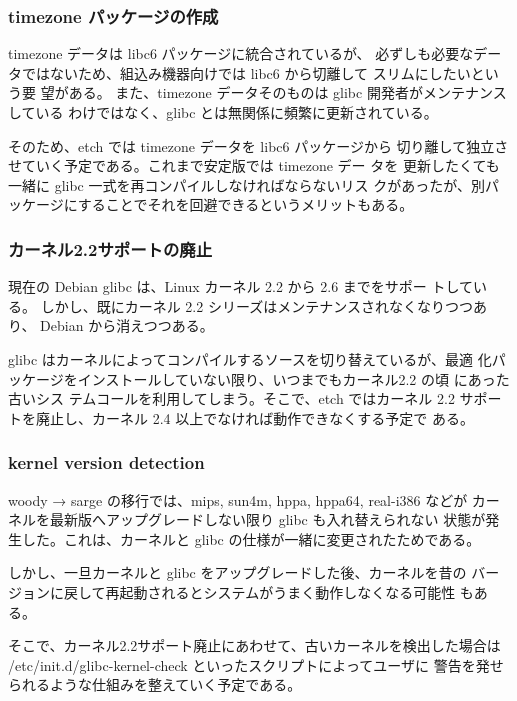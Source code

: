 \documentclass[mingoth,a4paper]{jsarticle}
\begin{document}
  \subsubsection{timezone パッケージの作成}

    timezone データは libc6 パッケージに統合されているが、
    必ずしも必要なデータではないため、組込み機器向けでは libc6 から切離して
    スリムにしたいという要
    望がある。
    また、timezone データそのものは glibc 開発者がメンテナンスしている
    わけではなく、glibc とは無関係に頻繁に更新されている。

    そのため、etch では timezone データを libc6 パッケージから
    切り離して独立させていく予定である。これまで安定版では timezone デー
    タを
    更新したくても一緒に glibc 一式を再コンパイルしなければならないリス
    クがあったが、別パッケージにすることでそれを回避できるというメリットもある。

  \subsubsection{カーネル2.2サポートの廃止}

    現在の Debian glibc は、Linux カーネル 2.2 から 2.6 までをサポー
    トしている。
    しかし、既にカーネル 2.2 シリーズはメンテナンスされなくなりつつあり、
    Debian から消えつつある。

    glibc はカーネルによってコンパイルするソースを切り替えているが、最適
    化パッケージをインストールしていない限り、いつまでもカーネル2.2 の頃
    にあった古いシス
    テムコールを利用してしまう。そこで、etch ではカーネル 2.2 
    サポートを廃止し、カーネル 2.4 以上でなければ動作できなくする予定で
    ある。

  \subsubsection{kernel version detection}

    woody → sarge の移行では、mips, sun4m, hppa, hppa64, real-i386 などが
    カーネルを最新版へアップグレードしない限り glibc も入れ替えられない
    状態が発生した。これは、カーネルと glibc の仕様が一緒に変更されたためである。

    しかし、一旦カーネルと glibc をアップグレードした後、カーネルを昔の
    バージョンに戻して再起動されるとシステムがうまく動作しなくなる可能性
    もある。

    そこで、カーネル2.2サポート廃止にあわせて、古いカーネルを検出した場合は 
    /etc/init.d/glibc-kernel-check といったスクリプトによってユーザに
    警告を発せられるような仕組みを整えていく予定である。
\end{document}
